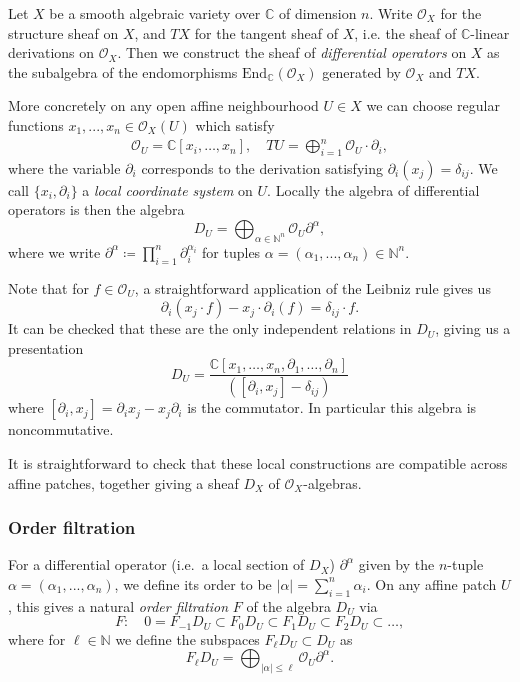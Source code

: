 Let \(X\) be a smooth algebraic variety over $\mathbb{C}$ of dimension $n$.
Write $\mathscr{O}_X$ for the structure sheaf on $X$, and $TX$ for the
tangent sheaf of $X$, i.e. the sheaf of $\mathbb{C}$-linear derivations on
$\mathscr{O}_X$. Then we construct the sheaf of \textit{differential operators}
on $X$ as the subalgebra of the endomorphisms
$\text{End}_\mathbb{C}(\mathscr{O}_X)$ generated by $\mathscr{O}_X$ and
$TX$. 

More concretely on any open affine neighbourhood $U\in X$ we can choose regular
functions \(x_1,...,x_n \in \mathscr{O}_X(U)\) which satisfy 
\begin{gather*}
    \mathscr{O}_U = \mathbb{C}[x_i,\dots, x_n], \quad
    TU = \bigoplus_{i=1}^n \mathscr{O}_U\cdot\partial_i,
\end{gather*} 
where the variable $\partial_i$ corresponds to the derivation satisfying
$\partial_i(x_j)=\delta_{ij}$. We call $\{x_i, \partial_i\}$ a \emph{local
coordinate system} on $U$. Locally the algebra of differential operators is then the algebra 
\begin{equation*}
    D_U = \bigoplus_{\alpha\in \mathbb{N}^n} \mathscr{O}_U \partial^\alpha,
\end{equation*} where we write \(\partial^\alpha \coloneqq
\prod_{i=1}^n\partial_i^{\alpha_i}\) for tuples \(\alpha = (\alpha_1,...,\alpha_n)\in
\mathbb{N}^n\).

Note that for $f\in \mathscr{O}_U$, a straightforward application of the Leibniz
rule gives us
\[\partial_i(x_j\cdot f)-x_j\cdot\partial_i(f) = \delta_{ij}\cdot f.\]
It can be checked that these are the only independent relations in \(D_U\),
giving us a presentation 
\begin{equation*}
    D_U= \frac{\mathbb{C}[x_1,\dots,x_n, \partial_1, \dots,
    \partial_n]}{\left([\partial_i, x_j] -\delta_{ij}\right)}
\end{equation*} 
where \([\partial_i,x_j] = \partial_ix_j-x_j\partial_i\) is the commutator. In
particular this algebra is noncommutative.

It is straightforward to check that these local constructions are compatible
across affine patches, together giving a sheaf \(D_X\) of
\(\mathscr{O}_X\)-algebras.

\subsubsection{Order filtration}
For a differential operator (i.e.\ a local section of \(D_X\))
\(\partial^\alpha\) given by the \(n\)-tuple \(\alpha=(\alpha_1,...,\alpha_n)\),
we define its order to be \(|\alpha|=\sum_{i=1}^n\alpha_i\). On any affine patch
\(U\), this gives a natural \emph{order filtration} $F$ of the algebra $D_U$ via
\begin{equation*}
    F:\quad 0=F_{-1}D_U\subset F_{0}D_U\subset F_{1}D_U\subset F_{2}D_U \subset\dots,
\end{equation*} 
where for $\ell\in \mathbb{N}$ we define the subspaces $F_\ell D_U \subset D_U$
as
\begin{equation*}
    F_\ell D_U  = \bigoplus_{|\alpha|\leq \ell} \mathscr{O}_U \partial^\alpha.
\end{equation*} 

